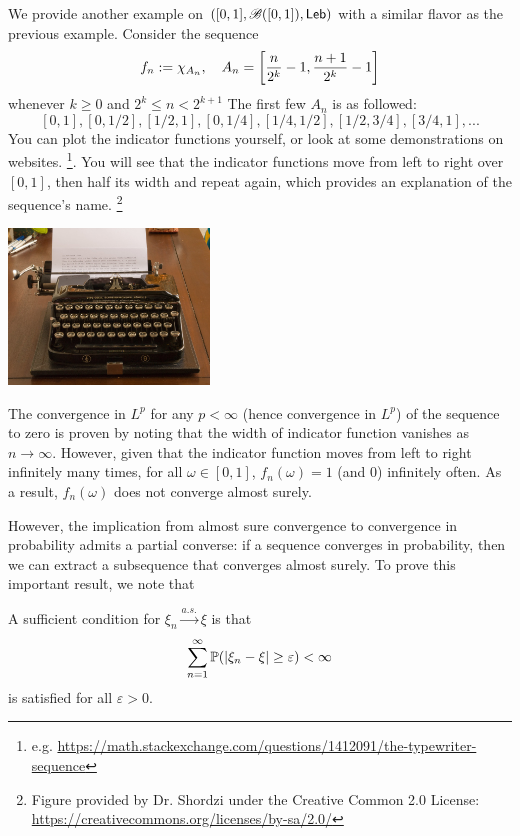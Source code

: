 \begin{example}
We provide another example on $([0,1], \mathcal{B}([0,1]), \mathsf{Leb})$ with a similar flavor as the previous example. Consider the sequence 
\begin{equation}
f_n := \chi_{A_n}, \quad A_n = \left[ \frac{n}{2^k} - 1, \frac{n+1}{2^k} - 1 \right]
\end{equation}
whenever $k \geq 0$ and $2^k \leq n < 2^{k+1}$ The first few $A_n$ is as followed: 
$$[0,1], [0,1/2], [1/2, 1], [0,1/4], [1/4,1/2], [1/2,3/4], [3/4,1], ...$$
You can plot the indicator functions yourself, or look at some demonstrations on websites. \footnote{e.g. \url{https://math.stackexchange.com/questions/1412091/the-typewriter-sequence}}. You will see that the indicator functions move from left to right over $[0,1]$, then half its width and repeat again, which provides an explanation of the sequence's name. \footnote{Figure provided by Dr. Shordzi under the Creative Common 2.0 License: \url{https://creativecommons.org/licenses/by-sa/2.0/}}

\begin{center}
\includegraphics[width=0.4\textwidth]{figures/typewriter.jpg}
\end{center}

The convergence in $L^p$ for any $p < \infty$ (hence convergence in $L^p$) of the sequence to zero is proven by noting that the width of indicator function vanishes as $n \to \infty$. However, given that the indicator function moves from left to right infinitely many times, for all $\omega \in [0,1]$, $f_n(\omega) = 1$ (and 0) infinitely often. As a result, $f_n(\omega)$ does not converge almost surely.
\end{example}

However, the implication from almost sure convergence to convergence in probability admits a partial converse: if a sequence converges in probability, then we can extract a subsequence that converges almost surely. To prove this important result, we note that 

\begin{lemma} \label{lem:as_conv_sufficient}
A sufficient condition for $\xi_n \xrightarrow{a.s.} \xi$ is that
\begin{equation*}
    \sum_{n=1}^\infty \mathbb{P}(|\xi_n - \xi| \ge \varepsilon) < \infty 
\end{equation*}
is satisfied for all $\varepsilon > 0$.
\end{lemma}

